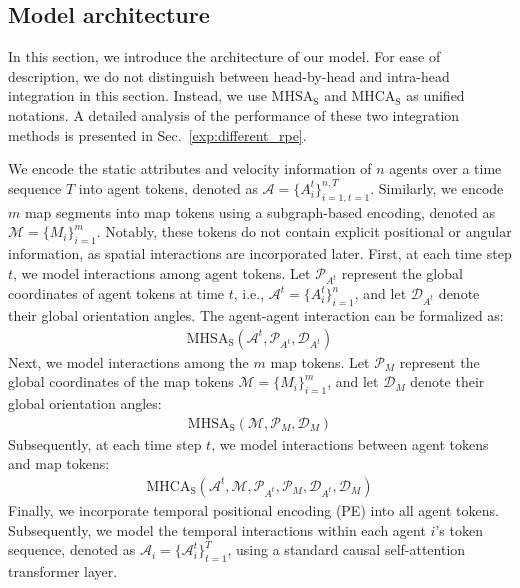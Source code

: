 \documentclass[lettersize,journal]{IEEEtran}
\theoremstyle{definition}
\begin{document}
\subsection{Model architecture}

In this section, we introduce the architecture of our model. For ease of description, we do not distinguish between head-by-head and intra-head integration in this section. Instead, we use \( \text{MHSA}_\text{S} \) and \( \text{MHCA}_\text{S} \) as unified notations. A detailed analysis of the performance of these two integration methods is presented in Sec.~\ref{exp:different_rpe}.

We encode the static attributes and velocity information of $n$ agents over a time sequence $T$ into agent tokens, denoted as $\mathcal{A} = \{A_i^t\}_{i=1,t=1}^{n,T}$. Similarly, we encode $m$ map segments into map tokens using a subgraph-based encoding, denoted as $\mathcal{M} = \{M_i\}_{i=1}^{m}$. Notably, these tokens do not contain explicit positional or angular information, as spatial interactions are incorporated later.
First, at each time step $t$, we model interactions among agent tokens. Let $\mathcal{P}_{A^t}$ represent the global coordinates of agent tokens at time $t$, i.e., $\mathcal{A}^t = \{A_i^t\}_{i=1}^{n}$, and let $\mathcal{D}_{A^t}$ denote their global orientation angles. The agent-agent interaction can be formalized as:
\begin{gather}
    \text{MHSA}_\text{S}(\mathcal{A}^t, \mathcal{P}_{A^t}, \mathcal{D}_{A^t})
\end{gather}
Next, we model interactions among the $m$ map tokens. Let $\mathcal{P}_M$ represent the global coordinates of the map tokens $\mathcal{M} = \{M_i\}_{i=1}^{m}$, and let $\mathcal{D}_M$ denote their global orientation angles:
\begin{gather}
    \text{MHSA}_\text{S}(\mathcal{M}, \mathcal{P}_M, \mathcal{D}_{M})
\end{gather}
Subsequently, at each time step $t$, we model interactions between agent tokens and map tokens:
\begin{gather}
    \text{MHCA}_\text{S}(\mathcal{A}^t, \mathcal{M}, \mathcal{P}_{A^t}, \mathcal{P}_M, \mathcal{D}_{A^t}, \mathcal{D}_{M})
\end{gather}
Finally, we incorporate temporal positional encoding (PE) into all agent tokens. Subsequently, we model the temporal interactions within each agent \( i \)'s token sequence, denoted as \( \mathcal{A}_i = \{\mathcal{A}_i^t\}_{t=1}^{T} \), using a standard causal self-attention transformer layer.
\end{document}
